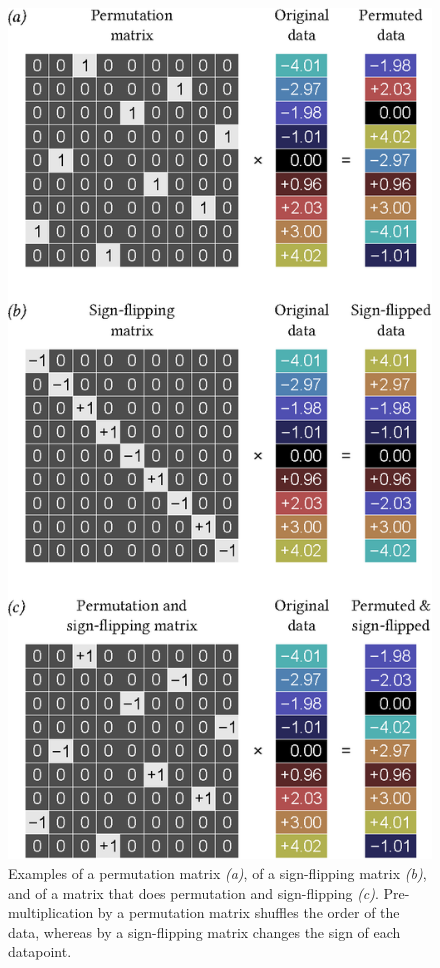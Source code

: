 \begin{figure}[!p]
\centering
\includegraphics{images/pmatrices.eps}
\caption[Examples of permutation and sign-flipping matrices]{Examples of a permutation matrix \emph{(a)}, of a sign-flipping matrix \emph{(b)}, and of a matrix that does permutation and sign-flipping \emph{(c)}. Pre-multiplication by a permutation matrix shuffles the order of the data, whereas by a sign-flipping matrix changes the sign of each datapoint.}
\label{fig:pmatrices}
\end{figure}


